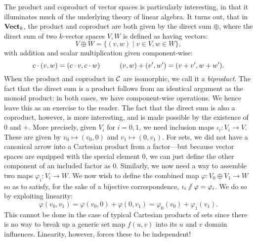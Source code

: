 The product and coproduct of vector spaces is particularly interesting, in that it illuminates much of the underlying theory of linear algebra. It turns out, that in $\mathbf{Vect}_k$, the product and coproduct are both given by the direct sum $\oplus$, where the direct sum of two $k$-vector spaces $V,W$ is defined as having vectors:
\[V\oplus W=\{(v,w)\mid v\in V,w\in W\},\]
with addition and scalar multiplication given component-wise:
\[c\cdot (v,w) = (c\cdot v,c\cdot w) \hspace{10 mm} (v,w)+(v',w') = (v+v',w+w').\]
When the product and coproduct in $\mathcal{C}$ are isomorphic, we call it a \emph{biproduct}. The fact that the direct sum is a product follows from an identical argument as the monoid product: in both cases, we have component-wise operations. We hence leave this as an exercise to the reader. The fact that the direct sum is also a coproduct, however, is more interesting, and is made possible by the existence of $0$ and $+$. More precisely, given $V_i$ for $i=0,1$, we need inclusion maps $\iota_i:V_i\to V$. These are given by $v_0\mapsto (v_0,0)$ and $v_1\mapsto (0,v_1)$. For sets, we did not have a canonical arrow into a Cartesian product from a factor---but because vector spaces are equipped with the special element $0$, we can just define the other component of an included factor as $0$. Similarly, we now need a way to assemble two maps $\varphi_i:V_i\to W$. We now wish to define the combined map $\varphi:V_0\oplus V_1\to W$ so as to satisfy, for the sake of a bijective correspondence, $\iota_i\sslash \varphi=\varphi_i$. We do so by exploiting linearity:
\[\varphi(v_0,v_1)=\varphi(v_0,0) + \varphi(0,v_1) = \varphi_0(v_0)+\varphi_1(v_1).\]
This cannot be done in the case of typical Cartesian products of sets since there is no way to break up a generic set map $f(u,v)$ into its $u$ and $v$ domain influences. Linearity, however, forces these to be independent!

